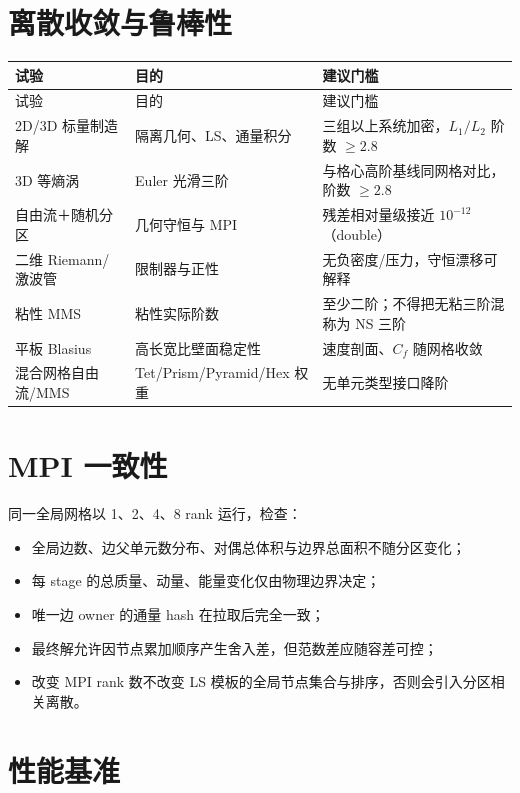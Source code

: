\documentclass[UTF8,a4paper,11pt,openany]{ctexrep}
\numberwithin{equation}{chapter}
\begin{document}
\section{离散收敛与鲁棒性}

\begin{longtable}{>{\raggedright\arraybackslash}p{}p{}p{}}
\toprule
试验 & 目的 & 建议门槛\\
\midrule
\endfirsthead
\toprule
试验 & 目的 & 建议门槛\\
\midrule
\endhead
2D/3D 标量制造解 & 隔离几何、LS、通量积分 & 三组以上系统加密，$L_1/L_2$ 阶数 $\ge2.8$\\
3D 等熵涡 & Euler 光滑三阶 & 与格心高阶基线同网格对比，阶数 $\ge2.8$\\
自由流＋随机分区 & 几何守恒与 MPI & 残差相对量级接近 $10^{-12}$（double）\\
二维 Riemann/激波管 & 限制器与正性 & 无负密度/压力，守恒漂移可解释\\
粘性 MMS & 粘性实际阶数 & 至少二阶；不得把无粘三阶混称为 NS 三阶\\
平板 Blasius & 高长宽比壁面稳定性 & 速度剖面、$C_f$ 随网格收敛\\
混合网格自由流/MMS & Tet/Prism/Pyramid/Hex 权重 & 无单元类型接口降阶\\
\bottomrule
\end{longtable}

\section{MPI 一致性}

同一全局网格以 1、2、4、8 rank 运行，检查：

\begin{itemize}
  \item 全局边数、边父单元数分布、对偶总体积与边界总面积不随分区变化；
  \item 每 stage 的总质量、动量、能量变化仅由物理边界决定；
  \item 唯一边 owner 的通量 hash 在拉取后完全一致；
  \item 最终解允许因节点累加顺序产生舍入差，但范数差应随容差可控；
  \item 改变 MPI rank 数不改变 LS 模板的全局节点集合与排序，否则会引入分区相关离散。
\end{itemize}

\section{性能基准}
\end{document}
